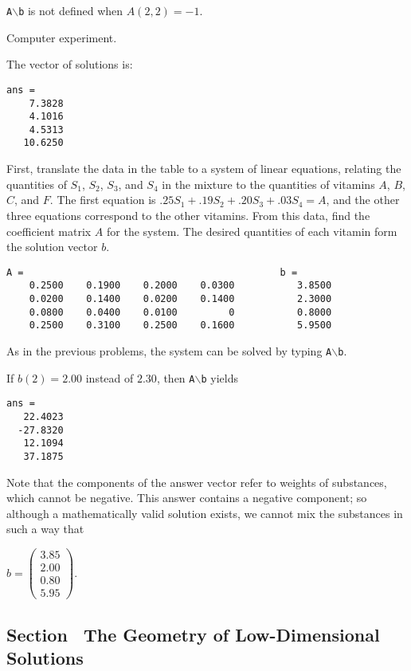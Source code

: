 {\tt A}$\backslash${\tt b} is not defined when $A(2,2) = -1$.

 Computer experiment.

 \ans The vector of solutions is:
\begin{verbatim}
ans =
    7.3828
    4.1016
    4.5313
   10.6250
\end{verbatim}
\soln First, translate the data in the table to a system of linear
equations, relating the quantities of $S_1$, $S_2$, $S_3$, and $S_4$
in the mixture to the quantities of vitamins $A$, $B$, $C$, and $F$. 
The first equation is $.25S_1 + .19S_2 + .20S_3 + .03S_4 = A$, and
the other three equations correspond to the other vitamins.  From
this data, find the coefficient matrix $A$ for the system.  The desired
quantities of each vitamin form the solution vector $b$.
\begin{verbatim}
A =                                             b =
    0.2500    0.1900    0.2000    0.0300           3.8500
    0.0200    0.1400    0.0200    0.1400           2.3000
    0.0800    0.0400    0.0100         0           0.8000
    0.2500    0.3100    0.2500    0.1600           5.9500
\end{verbatim}
As in the previous problems, the system can be solved by
typing {\tt A}$\backslash${\tt b}.

\para If $b(2) = 2.00$ instead of $2.30$, then
{\tt A}$\backslash${\tt b} yields

\begin{verbatim}
ans =
   22.4023
  -27.8320
   12.1094
   37.1875
\end{verbatim}
Note that the components of the answer vector refer to weights of
substances, which cannot be negative.  This answer contains a negative
component; so although a mathematically valid solution exists, we
cannot mix the substances in such a way that

$b = \left(\begin{array}{r} 3.85 \\ 2.00 \\ 0.80 \\ 5.95\end{array} \right)$.



\subsection*{Section~\protect{\ref{S:2.2}} The Geometry of Low-Dimensional
Solutions}

